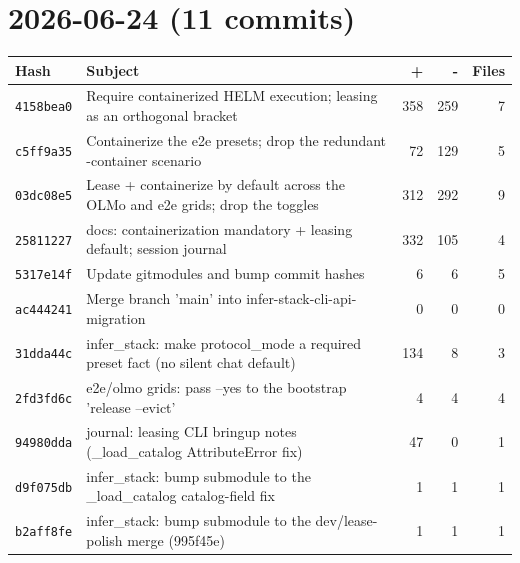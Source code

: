 \section*{2026-06-24 (11 commits)}
\begin{longtable}{@{}p{}p{}r r r@{}}
\toprule Hash & Subject & + & - & Files \\ \midrule\endhead
\texttt{4158bea0} & Require containerized HELM execution; leasing as an orthogonal bracket & 358 & 259 & 7 \\
\texttt{c5ff9a35} & Containerize the e2e presets; drop the redundant -container scenario & 72 & 129 & 5 \\
\texttt{03dc08e5} & Lease + containerize by default across the OLMo and e2e grids; drop the toggles & 312 & 292 & 9 \\
\texttt{25811227} & docs: containerization mandatory + leasing default; session journal & 332 & 105 & 4 \\
\texttt{5317e14f} & Update gitmodules and bump commit hashes & 6 & 6 & 5 \\
\texttt{ac444241} & Merge branch 'main' into infer-stack-cli-api-migration & 0 & 0 & 0 \\
\texttt{31dda44c} & infer\_stack: make protocol\_mode a required preset fact (no silent chat default) & 134 & 8 & 3 \\
\texttt{2fd3fd6c} & e2e/olmo grids: pass --yes to the bootstrap 'release --evict' & 4 & 4 & 4 \\
\texttt{94980dda} & journal: leasing CLI bringup notes (\_load\_catalog AttributeError fix) & 47 & 0 & 1 \\
\texttt{d9f075db} & infer\_stack: bump submodule to the \_load\_catalog catalog-field fix & 1 & 1 & 1 \\
\texttt{b2aff8fe} & infer\_stack: bump submodule to the dev/lease-polish merge (995f45e) & 1 & 1 & 1 \\
\bottomrule\end{longtable}
